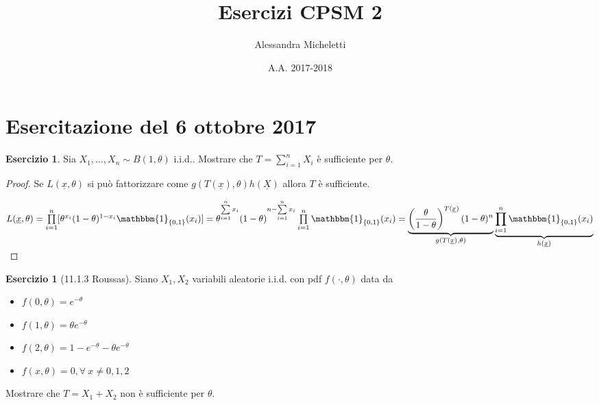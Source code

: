 \documentclass[hidelinks, 10pt]{report}
\author{Alessandra Micheletti}
\date{A.A. 2017-2018}
\title{Esercizi CPSM 2}
\begin{document}
\newcommand{\defeq}{\vcentcolon=}
\newcommand{\eqdef}{=\vcentcolon}
\providecommand{\ML}[1]{\hat{#1}_{\text{ML}}}
\providecommand{\compl}[1]{\prescript{c}{}{#1}}

\theoremstyle{plain}
\newtheorem{thm}{Teorema}[]
\renewcommand{\thesection}{\arabic{section}}

\theoremstyle{definition}
\newtheorem{defn}[]{Definizione}
\newtheorem{prop}[]{Proposizione}
\newtheorem{cor}[]{Corollario}
\newtheorem{lem}[]{Lemma}
\newtheorem{oss}[]{Osservazione}
\newtheorem{nota}[]{Nota}
\newtheorem{es}[]{Esempio}
\newtheorem{ex}[]{Esercizio}

\maketitle

\section{Esercitazione del 6 ottobre 2017}
\begin{ex}
Sia $ X_1, \dotsc, X_n \sim B(1, \theta) $ i.i.d.. Mostrare che $ T = \sum\limits_{i = 1}^{n} X_i $ \`e sufficiente per $ \theta $. 
\end{ex}
\begin{proof}
Se $ L(\underline{x}, \theta) $ si pu\`o fattorizzare come $ g(T(\underline{x}), \theta) h(\underline{X}) $ allora $ T $ \`e sufficiente.

$ L(\underline{x}, \theta) = \prod\limits_{i = 1}^{n} [\theta^{x_i} (1 - \theta)^{1 - x_i} \mathbbm{1}_{\{0, 1 \}} (x_i) ] = \theta^{\sum\limits_{i = 1}^{n} x_i} (1 - \theta)^{n - \sum\limits_{i = 1}^{n} x_i} \prod\limits_{i = 1}^{n} \mathbbm{1}_{\{ 0, 1 \}} (x_i) = \underbrace{\left( \frac{\theta}{1 - \theta} \right)^{T(\underline{x})} (1 - \theta)^n}_{g(T(\underline{x}), \theta)} \underbrace{\prod\limits_{i = 1}^{n} \mathbbm{1}_{\{ 0, 1 \}} (x_i)}_{h(\underline{x})} $
\end{proof}

\begin{ex}[11.1.3 Roussas]
Siano $ X_1, X_2 $ variabili aleatorie i.i.d. con pdf $ f(\cdot, \theta) $ data da

\begin{itemize}
\item $  f(0, \theta) = e^{- \theta} $
\item $  f(1, \theta) = \theta e^{- \theta} $
\item $  f(2, \theta) = 1 - e^{- \theta} - \theta e^{-\theta} $
\item $  f(x, \theta) = 0, \forall\ x \ne 0, 1, 2 $
\end{itemize}

Mostrare che $ T = X_1 + X_2 $ non \`e sufficiente per $ \theta $.
\end{ex}
\end{document}

